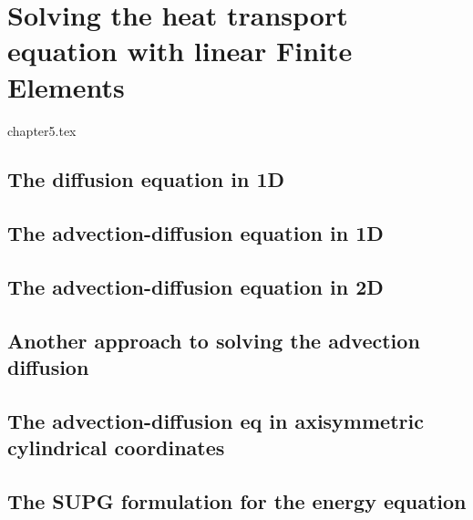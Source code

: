 \chapter{Solving the heat transport equation with linear Finite Elements \label{chapt5}} %

\begin{flushright} {\tiny {\color{gray} chapter5.tex}} \end{flushright}

\section{The diffusion equation in 1D} \label{sec:diff1D}  %
\section{The advection-diffusion equation in 1D} \label{sec:advec-diff1D} %
\section{The advection-diffusion equation in 2D} \label{ss:hte_fem} %
\section{Another approach to solving the advection diffusion}\label{ss:hte_diff} 
\section{The advection-diffusion eq in axisymmetric cylindrical coordinates}\label{ss:hte_axisym} 

\section{The SUPG formulation for the energy equation} \label{ss:supg}  %
